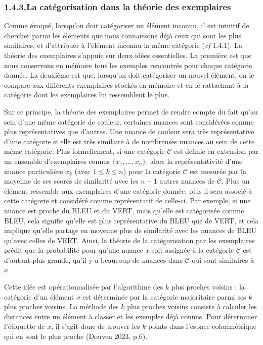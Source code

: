 \documentclass{article}
\begin{document}
\subsubsection*{1.4.3.\quad La catégorisation dans la théorie des exemplaires}

Comme évoqué, lorsqu’on doit catégoriser un élément inconnu, il est intuitif de chercher parmi les éléments que nous connaissons déjà ceux qui sont les plus similaires, et d'attribuer à l'élément inconnu la même catégorie (\textit{cf} 1.4.1). La théorie des exemplaires s’appuie sur deux idées essentielles. La première est que nous conservons en mémoire tous les exemples rencontrés pour chaque catégorie donnée. La deuxième est que, lorsqu’on doit catégoriser un nouvel élément, on le compare aux différents exemplaires stockés en mémoire et en le rattachant à la catégorie dont les exemplaires lui ressemblent le plus.
\par
Sur ce principe, la théorie des exemplaires permet de rendre compte du fait qu'au sein d'une même catégorie de couleur, certaines nuances sont considérées comme plus représentatives que d'autres. Une nuance de couleur sera très représentative d’une catégorie si elle est très similaire à de nombreuses nuances au sein de cette même catégorie. Plus formellement, si une catégorie $\mathcal{C}$ est définie en extension par un ensemble d'exemplaires connus $\{x_1, \ldots, x_n\}$, alors la représentativité d'une nuance particulière $x_k$ (avec $1 \leq k \leq n$) pour la catégorie $\mathcal{C}$ est mesurée par la moyenne de ses scores de similarité avec les $n-1$ autres nuances de $\mathcal{C}$. Plus un élément ressemble aux exemplaires d'une catégorie donnée, plus il sera associé à cette catégorie et considéré comme représentatif de celle-ci. Par exemple, si une nuance est proche du BLEU et du VERT, mais qu’elle est catégorisée comme BLEU, cela signifie qu’elle est plus représentative du BLEU que de VERT, et cela implique qu’elle partage en moyenne plus de similarité avec les nuances de BLEU qu’avec celles de VERT. Ainsi, la théorie de la catégorisation par les exemplaires prédit que la probabilité pour qu'une nuance $x$ soit assignée à la catégorie $\mathcal{C}$ est d’autant plus grande, qu’il y a beaucoup de nuances dans $\mathcal{C}$ qui sont similaires à $x$.
\par
Cette idée est opérationnalisée par l’algorithme des $k$ plus proches voisins : la catégorie d’un élément $x$ est déterminée par la catégorie majoritaire parmi ses $k$ plus proches voisins. La méthode des $k$ plus proches voisins consiste à calculer les distances entre un élément à classer et les exemples déjà connus. Pour déterminer l’étiquette de $x$, il s’agit donc de trouver les $k$ points dans l’espace colorimétrique qui en sont le plus proche (Douven 2023, p.6).
\end{document}
